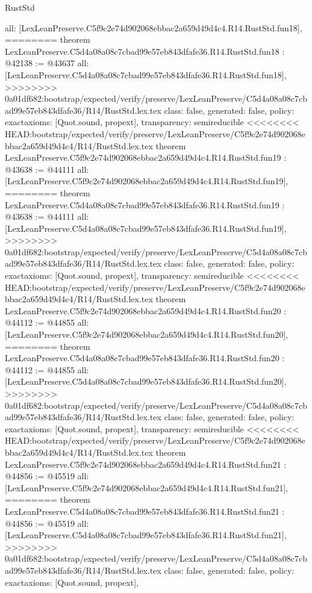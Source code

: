 \begin{lexlean}{RustStd}
\begin{coremodule}
{\begin{coremodule}
{{{{{{{{{{{{{{{{{{{{{  all: [LexLeanPreserve.C5f9c2e74d902068ebbac2a659d49d4c4.R14.RustStd.fun18],
========
theorem LexLeanPreserve.C5d4a08a08c7cbad99e57eb843dfafe36.R14.RustStd.fun18 : @42138 := @43637 {
  all: [LexLeanPreserve.C5d4a08a08c7cbad99e57eb843dfafe36.R14.RustStd.fun18],
>>>>>>>> 0a01df682:bootstrap/expected/verify/preserve/LexLeanPreserve/C5d4a08a08c7cbad99e57eb843dfafe36/R14/RustStd.lex.tex
  class: false,
  generated: false,
  policy: exact{axioms: [Quot.sound, propext]},
  transparency: semireducible
}
<<<<<<<< HEAD:bootstrap/expected/verify/preserve/LexLeanPreserve/C5f9c2e74d902068ebbac2a659d49d4c4/R14/RustStd.lex.tex
theorem LexLeanPreserve.C5f9c2e74d902068ebbac2a659d49d4c4.R14.RustStd.fun19 : @43638 := @44111 {
  all: [LexLeanPreserve.C5f9c2e74d902068ebbac2a659d49d4c4.R14.RustStd.fun19],
========
theorem LexLeanPreserve.C5d4a08a08c7cbad99e57eb843dfafe36.R14.RustStd.fun19 : @43638 := @44111 {
  all: [LexLeanPreserve.C5d4a08a08c7cbad99e57eb843dfafe36.R14.RustStd.fun19],
>>>>>>>> 0a01df682:bootstrap/expected/verify/preserve/LexLeanPreserve/C5d4a08a08c7cbad99e57eb843dfafe36/R14/RustStd.lex.tex
  class: false,
  generated: false,
  policy: exact{axioms: [Quot.sound, propext]},
  transparency: semireducible
}
<<<<<<<< HEAD:bootstrap/expected/verify/preserve/LexLeanPreserve/C5f9c2e74d902068ebbac2a659d49d4c4/R14/RustStd.lex.tex
theorem LexLeanPreserve.C5f9c2e74d902068ebbac2a659d49d4c4.R14.RustStd.fun20 : @44112 := @44855 {
  all: [LexLeanPreserve.C5f9c2e74d902068ebbac2a659d49d4c4.R14.RustStd.fun20],
========
theorem LexLeanPreserve.C5d4a08a08c7cbad99e57eb843dfafe36.R14.RustStd.fun20 : @44112 := @44855 {
  all: [LexLeanPreserve.C5d4a08a08c7cbad99e57eb843dfafe36.R14.RustStd.fun20],
>>>>>>>> 0a01df682:bootstrap/expected/verify/preserve/LexLeanPreserve/C5d4a08a08c7cbad99e57eb843dfafe36/R14/RustStd.lex.tex
  class: false,
  generated: false,
  policy: exact{axioms: [Quot.sound, propext]},
  transparency: semireducible
}
<<<<<<<< HEAD:bootstrap/expected/verify/preserve/LexLeanPreserve/C5f9c2e74d902068ebbac2a659d49d4c4/R14/RustStd.lex.tex
theorem LexLeanPreserve.C5f9c2e74d902068ebbac2a659d49d4c4.R14.RustStd.fun21 : @44856 := @45519 {
  all: [LexLeanPreserve.C5f9c2e74d902068ebbac2a659d49d4c4.R14.RustStd.fun21],
========
theorem LexLeanPreserve.C5d4a08a08c7cbad99e57eb843dfafe36.R14.RustStd.fun21 : @44856 := @45519 {
  all: [LexLeanPreserve.C5d4a08a08c7cbad99e57eb843dfafe36.R14.RustStd.fun21],
>>>>>>>> 0a01df682:bootstrap/expected/verify/preserve/LexLeanPreserve/C5d4a08a08c7cbad99e57eb843dfafe36/R14/RustStd.lex.tex
  class: false,
  generated: false,
  policy: exact{axioms: [Quot.sound, propext]},
}}}}}}}}}}}}}}}}}}}}}}}}}
\end{coremodule}}
\end{coremodule}
\end{lexlean}
